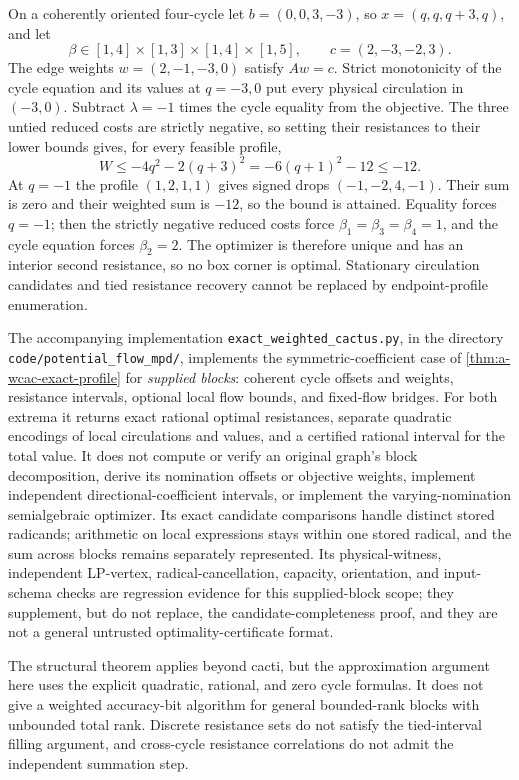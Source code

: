 \begin{example}
\label{ex:a-wcac-interior}
On a coherently oriented four-cycle let $b=(0,0,3,-3)$, so
$x=(q,q,q+3,q)$, and let
\[
 \beta\in[1,4]\times[1,3]\times[1,4]\times[1,5],
 \qquad c=(2,-3,-2,3).
\]
The edge weights $w=(2,-1,-3,0)$ satisfy $Aw=c$. Strict monotonicity of
the cycle equation and its values at $q=-3,0$ put every physical
circulation in $(-3,0)$. Subtract $\lambda=-1$ times the cycle equality
from the objective. The three untied reduced costs are strictly negative,
so setting their resistances to their lower bounds gives, for every
feasible profile,
\[
 W\le-4q^2-2(q+3)^2=-6(q+1)^2-12\le-12.
\]
At $q=-1$ the profile $(1,2,1,1)$ gives signed drops $(-1,-2,4,-1)$.
Their sum is zero and their weighted sum is $-12$, so the bound is attained.
Equality forces $q=-1$; then the strictly negative reduced costs force
$\beta_1=\beta_3=\beta_4=1$, and the cycle equation forces $\beta_2=2$.
The optimizer is therefore unique and has an interior second resistance,
so no box corner is optimal. Stationary circulation candidates and tied
resistance recovery cannot be replaced by endpoint-profile enumeration.
\end{example}

The accompanying implementation
\texttt{exact\_weighted\_cactus.py}, in the directory
\texttt{code/potential\_flow\_mpd/},
implements the symmetric-coefficient case of
\cref{thm:a-wcac-exact-profile} for \emph{supplied blocks}:
coherent cycle offsets and weights, resistance intervals, optional local
flow bounds, and fixed-flow bridges. For both extrema it returns exact
rational optimal resistances, separate quadratic encodings of local
circulations and values, and a certified rational interval for the total
value. It does not compute or verify an original graph's block
decomposition, derive its nomination offsets or objective weights,
implement independent directional-coefficient intervals, or implement the
varying-nomination semialgebraic optimizer.
Its exact candidate comparisons handle distinct stored radicands;
arithmetic on local expressions stays within one stored radical, and the
sum across blocks remains separately represented. Its physical-witness,
independent LP-vertex, radical-cancellation, capacity, orientation, and
input-schema checks are regression evidence for this supplied-block
scope; they supplement, but do not replace, the candidate-completeness
proof, and they are not a general untrusted optimality-certificate format.

The structural theorem applies beyond cacti, but the approximation
argument here uses the explicit quadratic, rational, and zero cycle
formulas. It does not give a weighted accuracy-bit algorithm for general
bounded-rank blocks with unbounded total rank. Discrete resistance sets
do not satisfy the tied-interval filling argument, and cross-cycle
resistance correlations do not admit the independent summation step.
